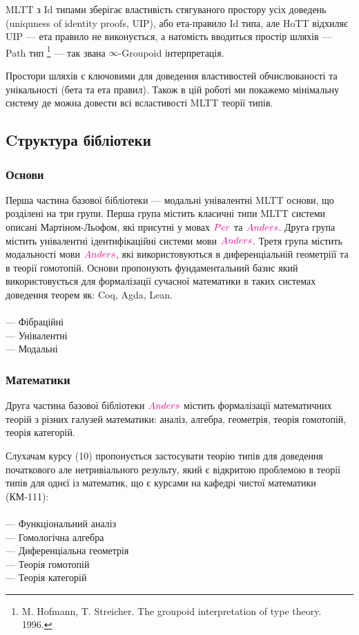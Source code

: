 MLTT з Id типами зберігає властивість стягуваного простору усіх
доведень (uniquness of identity proofs, UIP), або ета-правило Id типа,
але HoTT відхиляє UIP --- ета правило не виконується, а натомість
вводиться простір шляхів --- Path тип \footnote{M. Hofmann, T. Streicher.
The groupoid interpretation of type theory. 1996.} --- так
звана $\infty$-Groupoid інтерпретація.

Простори шляхів є ключовими для доведення властивостей обчислюваності
та унікальності (бета та ета правил). Також в цій роботі ми покажемо
мінімальну систему де можна довести всі всластивості MLTT теорії типів.

\newpage
\subsection{Cтруктура бібліотеки}

\subsubsection{Основи}
Перша частина базової бібліотеки --- модальні унівалентні MLTT основи,
що розділені на три групи. Перша група містить класичні типи MLTT
системи описані Мартіном-Льофом, які присутні у мовах $\textcolor{magenta}{Per}$
та $\textcolor{magenta}{Anders}$. Друга група містить унівалентні ідентифікаційні
системи мови $\textcolor{magenta}{Anders}$. Третя група містить модальності мови
$\textcolor{magenta}{Anders}$, які використовуються в диференціальній геометріїї
та в теорії гомотопій. Основи пропонують фундаментальний базис який
використовується для формалізації сучасної математики в таких системах
доведення теорем як: Coq, Agda, Lean.
\\
\\
\noindent
--- Фібраційні \\
--- Унівалентні \\
--- Модальні

\subsubsection{Математики}

Друга частина базової бібліотеки $\textcolor{magenta}{Anders}$ містить формалізації математичних
теорій з різних галузей математики: аналіз, алгебра, геометрія,
теорія гомотопій, теорія категорій.

Слухачам курсу (10) пропонується застосувати теорію типів для
доведення початкового але нетривіального результу, який є
відкритою проблемою в теорії типів для однєї із математик,
що є курсами на кафедрі чистої математики (КМ-111):\\
\\
\noindent
--- Функціональний аналіз \\
--- Гомологічна алгебра \\
--- Диференціальна геометрія \\
--- Теорія гомотопій \\
--- Теорія категорій \\

